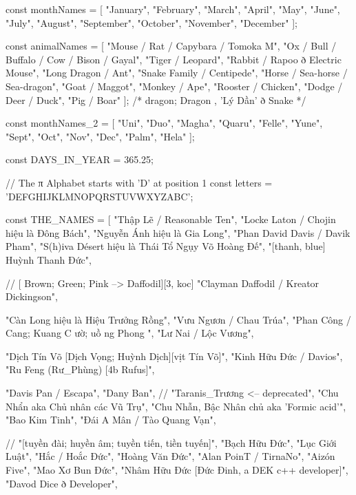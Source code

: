         const monthNames = [
            "January", "February", "March", "April", "May", "June",
            "July", "August", "September", "October", "November", "December"
        ];



        const animalNames = [
            "Mouse / Rat / Capybara / Tomoka M", "Ox / Bull / Buffalo / Cow / Bison / Gayal", 
            "Tiger / Leopard", "Rabbit / Rapoo ð Electric Mouse", "Long Dragon / Ant", "Snake Family / Centipede",
            "Horse / Sea-horse / Sea-dragon", "Goat / Maggot", "Monkey / Ape", 
            "Rooster / Chicken", "Dodge / Deer / Duck", "Pig / Boar"
        ]; /* { dragon; Dragon }, 'Lý Dần' ð Snake */


        const monthNames_2 = [
            "Uni", "Duo", "Magha", "Quaru", "Felle", "Yune",
            "Sept", "Oct", "Nov", "Dec", "Palm", "Hela"
        ];


        const DAYS_IN_YEAR = 365.25;


        // The π Alphabet starts with 'D' at position 1
        const letters = 'DEFGHIJKLMNOPQRSTUVWXYZABC';



        const THE_NAMES = [
            "Thập Lẽ / Reasonable Ten",
            "Locke Laton / Chojin hiệu là Đông Bách",
            "Nguyễn Ánh hiệu là Gia Long",
            "Phan David Davis / Davik Pham",
            "S(h)iva Désert hiệu là Thái Tổ Ngụy Võ Hoàng Đế",
            "[thanh, blue] Huỳnh Thanh Đức",

            // [{ Brown; Green; Pink } --> Daffodil][3, koc]
            "Clayman Daffodil / Kreator Dickingson",

            "Càn Long hiệu là Hiệu Trưởng Rồng",
            "Vưu Ngươn / Chau Trúa",
            "Phan Công / { Cang; Kuang } C{ ườ; uồ }ng Phong ",
            "Lư Nai / Lộc Vương",

            "Dịch Tín Võ [Dịch Vọng; Huỳnh Dịch][vịt Tín Võ]",
            "Kinh Hữu Đức / Davios",
            "Ru Feng (Rư_Phùng) [4b Rufus]",

            "Davis Pan / Escapa",
            "Dany Ban",
            // "Taranis_Trương <-- deprecated",
            "Chu Nhẩn aka Chủ nhân các Vũ Trụ",
            "Chu Nhẫn, Bậc Nhân chủ aka 'Formic acid'",
            "Bao Kim Tinh",
            "Đái A Mân / Tào Quang Vạn",

            // "[tuyền đài; huyền âm; tuyền tiến, tiền tuyến]",
            "Bạch Hữu Đức",
            "Lục Giới Luật",
            "Hắc / Hoắc Đức",
            "Hoàng Văn Đức",
            "Alan PoinT / TirnaNo",
            "Aizón Five",
            "Mao Xơ Bun Đức",
            "Nhâm Hữu Đức [Đức Đinh, a DEK c++ developer]",
            "Davod Dice ð Developer",

